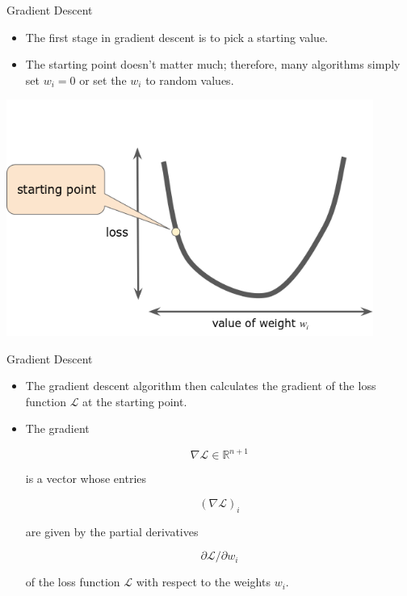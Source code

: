 \documentclass{beamer}
\begin{document}
\begin{frame}{Gradient Descent}
\begin{itemize}
\item The first stage in gradient descent is to pick a starting value. 

\medskip
\item The starting point doesn't matter much; therefore, many algorithms simply set $w_i=0$ or set the $w_i$ to random values.
\end{itemize}

\includegraphics[width=0.9\textwidth]{images/GradientDescentStartingPoint.png}
\end{frame}


\begin{frame}{Gradient Descent}
\begin{itemize}
\item The gradient descent algorithm then calculates the gradient of the loss function $\mathcal{L}$ at the starting point. 

\medskip
\item The gradient 

$$\nabla\mathcal{L}\in\mathbb{R}^{n+1}$$ 

is a vector whose entries 

$$(\nabla\mathcal{L})_i$$ 

are given by the partial derivatives 

$$\partial \mathcal{L}/\partial w_i$$ 

of the loss function $\mathcal{L}$ with respect to the weights $w_i$.
\end{itemize}
\end{frame}

\end{document}
